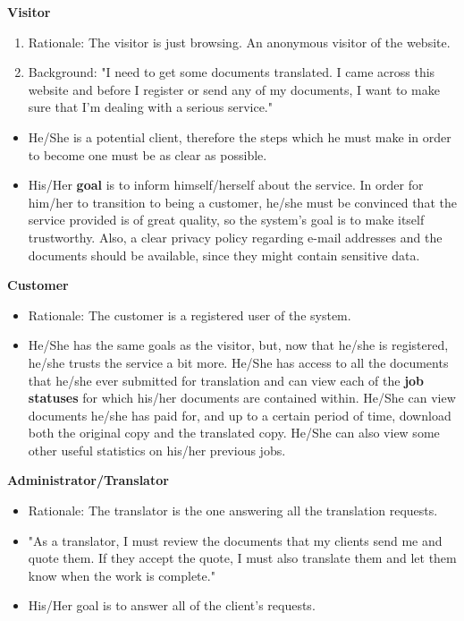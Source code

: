 \documentclass{l3proj}
\begin{document}
\textbf{Visitor}
\begin{enumerate}
\item{Rationale: The visitor is just browsing. An anonymous visitor of the website.}
\item{Background: "I need to get some documents translated. I came across this website and before I register or send any of my documents, I want to make sure that I'm dealing with a serious service."}
\end{enumerate}
\begin{itemize}
\item{He/She is a potential client, therefore the steps which he must make in order to become one must be as clear as possible.}
\item{His/Her \textbf{goal} is to inform himself/herself about the service. In order for him/her to transition to being a customer, he/she must be convinced that the service provided is of great quality, so the system's goal is to make itself trustworthy. Also, a clear privacy policy regarding e-mail addresses and the documents should be available, since they might contain sensitive data.}
\end{itemize}
\textbf{Customer}
\begin{itemize}
\item{Rationale: The customer is a registered user of the system.}
\item{He/She has the same goals as the visitor, but, now that he/she is registered, he/she trusts the service a bit more. He/She has access to all the documents that he/she ever submitted for translation and can view each of the \textbf{job statuses} for which his/her documents are contained within. He/She can view documents he/she has paid for, and up to a certain period of time, download both the original copy and the translated copy. He/She can also view some other useful statistics on his/her previous jobs.}
\end{itemize}
\textbf{Administrator/Translator}
\begin{itemize}
\item{Rationale: The translator is the one answering all the translation requests.}
\item{"As a translator, I must review the documents that my clients send me and quote them. If they accept the quote, I must also translate them and let them know when the work is complete."}
\item{His/Her goal is to answer all of the client's requests.}
\end{itemize}
\end{document}
